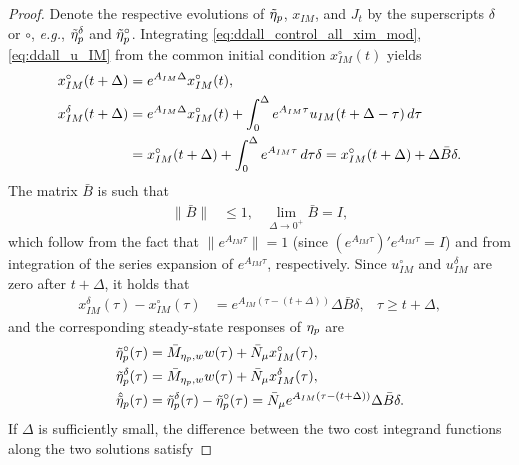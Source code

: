 \begin{proof}
  Denote the respective evolutions of $\tilde{\eta}_p$, $x_{IM}$, and $J_t$ by the superscripts $\delta$ or $\circ$, \emph{e.g.}, $\tilde{\eta}_p^\delta$ and $\tilde{\eta}_p^\circ$. Integrating \eqref{eq:ddall_control_all_xim_mod}, \eqref{eq:ddall_u_IM} from the
  common initial condition $x_{IM}^{\circ}(t)$ yields
  \begin{subequations}
    \begin{align}
      x_{IM}^{\circ}(t+\Delta) & = e^{A_{IM}\Delta}x_{IM}^{\circ}(t),\\
      x_{IM}^\delta(t+\Delta)  & = e^{A_{IM}\Delta}x_{IM}^{\circ}(t) + \int_{0}^{\Delta} e^{A_{IM}\tau}u_{IM}(t+\Delta-\tau)\,d\tau\notag\\
      &= x_{IM}^{\circ}(t+\Delta) + \int_{0}^{\Delta}e^{A_{IM}\tau}\,d\tau\delta = x_{IM}^{\circ}(t+\Delta)+\Delta\bar{B}\delta.
    \end{align}
  \end{subequations}
  The matrix $\bar{B}$ is such that
  \begin{align}
    \label{eq:ddall_norm_Bbar}
    \|\bar{B}\| &\leq 1, & \lim_{\Delta\rightarrow0^{+}}\bar{B}=I,
  \end{align}
  which follow from the fact that $\|e^{A_{IM}\tau}\|=1$ (since $(e^{A_{IM}\tau})'e^{A_{IM}\tau}=I$) and from integration of the series expansion of $e^{A_{IM}\tau}$, respectively. Since $u_{IM}^\circ$ and $u_{IM}^\delta$ are zero after $t+\Delta$, it holds that
  \begin{align}
    x_{IM}^{\delta}(\tau)-x_{IM}^{\circ}(\tau) &= e^{A_{IM}(\tau-(t+\Delta))}\Delta\bar{B}\delta, & \tau\geq t+\Delta,
  \end{align}
  and the corresponding steady-state responses of $\eta_p$ are
  \begin{subequations}
    \begin{align}
      \tilde{\eta}_p^{\circ}(\tau)  &= \bar{M}_{\eta_p,w}w(\tau) + \bar{N}_\mu x_{IM}^{\circ}(\tau),\\
      \tilde{\eta}_p^{\delta}(\tau) &= \bar{M}_{\eta_p,w}w(\tau) + \bar{N}_\mu x_{IM}^{\delta}(\tau),\\
      \hat{\tilde{\eta}}_p(\tau)  &= \tilde{\eta}_p^{\delta}(\tau)-\tilde{\eta}_p^{\circ}(\tau) = \bar{N}_\mu e^{A_{IM}(\tau-(t+\Delta))}\Delta\bar{B}\delta.\label{eq:ddall_ztilde}
    \end{align}
  \end{subequations}
  If $\Delta$ is sufficiently small, the difference between the two cost integrand functions along the two solutions satisfy

\end{proof}
